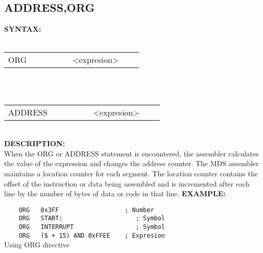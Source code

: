                \subsection{ADDRESS,ORG}
                \textbf{SYNTAX:}\\
                \\ {
                        \texttt{}
                        \begin{tabular}[h!]{llll}
                                { \color{highlight_directive} ORG } & \verb'         '
                                { \color{highlight_constant} <expresion> } & { \color{highlight_comment}  }\\
                        \end{tabular}
                    }\\
                \\ {
                        \texttt{}
                        \begin{tabular}[h!]{llll}
                                { \color{highlight_directive} ADDRESS } & \verb'         '
                                { \color{highlight_constant} <expresion> } & { \color{highlight_comment}  }\\
                        \end{tabular}
                    }\\
                \textbf{DESCRIPTION:}\\
                When the ORG or ADDRESS statement is encountered, the assembler calculates the value of the expression and changes the address counter.
                The MDS assembler maintains a location counter for each segment. The location counter contains the offset of the instruction or data
                being assembled and is incremented after each line by the number of bytes of data or code in that line.
                \textbf{EXAMPLE:}\\
                        \begin{code}[h!]
                                \verb'    '{\color{highlight_directive}\verb'ORG'}\verb'   '{\color{highlight_constant}\verb'0x3FF'}\verb'                  '{\color{highlight_comment}\verb'; Number'}\\
                                \verb'    '{\color{highlight_directive}\verb'ORG'}\verb'   '{\color{highlight_label}\verb'START:'}\verb'                    '{\color{highlight_comment}\verb'; Symbol'}\\
                                \verb'    '{\color{highlight_directive}\verb'ORG'}\verb'   '{\color{highlight_label}\verb'INTERRUPT'}\verb'                 '{\color{highlight_comment}\verb'; Symbol'}\\
                                \verb'    '{\color{highlight_directive}\verb'ORG'}\verb'   '{\color{highlight_constant}\verb'($ + 15) AND 0xFFEE'}\verb'    '{\color{highlight_comment}\verb'; Expresion'}\\
                        \caption{Using ORG directive}
                        \end{code}
